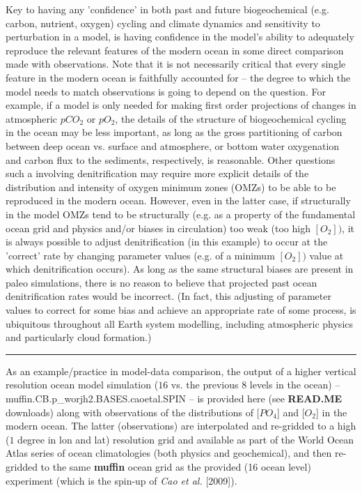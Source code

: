 Key  to having any 'confidence' in both past and future biogeochemical (e.g. carbon, nutrient, oxygen) cycling and climate dynamics and sensitivity to perturbation in a model, is having confidence in the model's ability to adequately reproduce the relevant features of the modern ocean in some direct comparison made with observations. Note that it is not necessarily critical that every single feature in the modern ocean is faithfully accounted for -- the degree to which the model needs  to match observations is going to depend on the question. For example, if a model is only needed for making first order projections of changes in atmospheric \(pCO_{2}\) or \(pO_{2}\), the details of the structure of biogeochemical cycling in the ocean may be less important, as long as the gross partitioning of carbon between deep ocean vs. surface and atmosphere, or  bottom water oxygenation and carbon flux to the sediments, respectively, is reasonable. Other questions such a involving denitrification may require more explicit details of the distribution and intensity of oxygen minimum zones (OMZs) to be able to be reproduced in the modern ocean. However, even in the latter case, if structurally in the model OMZs tend to be structurally (e.g. as a property of the fundamental ocean grid and physics and/or biases in circulation) too weak (too high \([O_{2}])\), it is always possible to adjust denitrification (in this example) to occur at the 'correct' rate by changing parameter values (e.g. of a minimum \([O_{2}])\) value at which denitrification occurs). As long as the same structural biases are present in paleo simulations, there is no reason to believe that projected past ocean denitrification rates would be incorrect. (In fact, this adjusting of parameter values to correct for some bias and achieve an appropriate rate of some process, is ubiquitous throughout all Earth system modelling, including atmospheric physics and particularly cloud formation.)

\vspace{1mm}
\noindent\rule{4cm}{0.5pt}
\vspace{2mm}

\noindent As an example/practice in model-data comparison, the output of a higher vertical resolution ocean model simulation (\(16\) vs. the previous \(8\) levels in the ocean) -- \textsf{\footnotesize muffin.CB.p\_worjh2.BASES.caoetal.SPIN} -- is provided here (see \textbf{READ.ME} downloads) along with observations of the distributions of \([PO_{4}\)] and \([O_{2}\)] in the modern ocean. The latter (observations) are interpolated and re-gridded to a high (\(1\) degree in lon and lat) resolution grid and available as part of the World Ocean Atlas series of ocean climatologies (both physics and geochemical), and then re-gridded to the same \textbf{muffin} ocean grid as the provided (16 ocean level) experiment (which is the spin-up of \textit{Cao et al.} [2009]).


